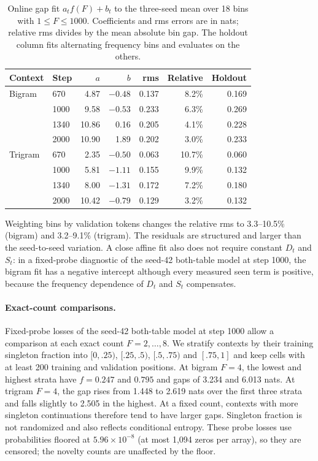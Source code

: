 \begin{table}[!htbp]
\centering\small
\caption{Online gap fit $a_tf(F)+b_t$ to the three-seed mean over 18 bins with $1\le F\le1000$. Coefficients and rms errors are in nats; relative rms divides by the mean absolute bin gap. The holdout column fits alternating frequency bins and evaluates on the others.}
\label{tab:affine}
\begin{tabular}{llrrrrr}
\toprule
Context & Step & $a$ & $b$ & rms & Relative & Holdout\\
\midrule
Bigram & 670 & 4.87 & $-0.48$ & 0.137 & 8.2\% & 0.169\\
 & 1000 & 9.58 & $-0.53$ & 0.233 & 6.3\% & 0.269\\
 & 1340 & 10.86 & 0.16 & 0.205 & 4.1\% & 0.228\\
 & 2000 & 10.90 & 1.89 & 0.202 & 3.0\% & 0.233\\
Trigram & 670 & 2.35 & $-0.50$ & 0.063 & 10.7\% & 0.060\\
 & 1000 & 5.81 & $-1.11$ & 0.155 & 9.9\% & 0.132\\
 & 1340 & 8.00 & $-1.31$ & 0.172 & 7.2\% & 0.180\\
 & 2000 & 10.42 & $-0.79$ & 0.129 & 3.2\% & 0.132\\
\bottomrule
\end{tabular}
\end{table}

Weighting bins by validation tokens changes the relative rms to 3.3--10.5\% (bigram) and 3.2--9.1\% (trigram). The residuals are structured and larger than the seed-to-seed variation. A close affine fit also does not require constant $D_t$ and $S_t$: in a fixed-probe diagnostic of the seed-42 both-table model at step 1000, the bigram fit has a negative intercept although every measured seen term is positive, because the frequency dependence of $D_t$ and $S_t$ compensates.

\paragraph{Exact-count comparisons.}
Fixed-probe losses of the seed-42 both-table model at step 1000 allow a comparison at each exact count $F=2,\ldots,8$. We stratify contexts by their training singleton fraction into $[0,.25)$, $[.25,.5)$, $[.5,.75)$ and $[.75,1]$ and keep cells with at least 200 training and validation positions. At bigram $F=4$, the lowest and highest strata have $f=0.247$ and $0.795$ and gaps of 3.234 and 6.013 nats. At trigram $F=4$, the gap rises from 1.448 to 2.619 nats over the first three strata and falls slightly to 2.505 in the highest. At a fixed count, contexts with more singleton continuations therefore tend to have larger gaps. Singleton fraction is not randomized and also reflects conditional entropy. These probe losses use probabilities floored at $5.96\times10^{-8}$ (at most 1,094 zeros per array), so they are censored; the novelty counts are unaffected by the floor.


